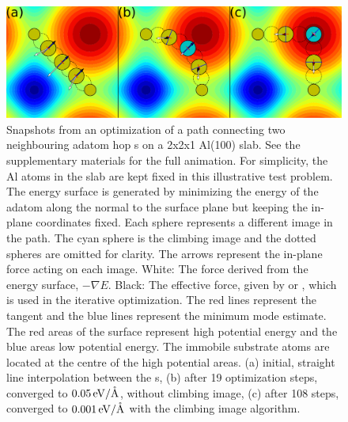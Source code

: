 \begin{figure}[b]
\begin{center}
\includegraphics[width=0.8\linewidth]{figures/snapshots}
\caption{Snapshots from an optimization of a path connecting two neighbouring adatom hop s on a 2x2x1 Al(100) slab.
See the supplementary materials for the full animation.
For simplicity, the Al atoms in the slab are kept fixed in this illustrative test problem.
The energy surface is generated by minimizing the energy of the adatom along the normal to the surface plane but keeping the in-plane coordinates fixed.
Each sphere represents a different image in the path. The cyan sphere is the climbing image and the dotted spheres are omitted for clarity.
The arrows represent the in-plane force acting on each image.
White: The force derived from the energy surface, $-\nabla E$.
Black: The effective force, given by  or , which is used in the iterative optimization.
The red lines represent the tangent and the blue lines represent the minimum mode estimate.
The red areas of the surface represent high potential energy and the blue areas low potential energy.
The immobile substrate atoms are located at the centre of the high potential areas.
(a) initial, straight line interpolation between the s, (b) after 19 optimization steps, converged to $0.05\, \mathrm{eV/\mathring{\mathrm{A}}}$, without climbing image, (c) after 108 steps, converged to $0.001\, \mathrm{eV/\mathring{\mathrm{A}}}$ with the climbing image algorithm.}
\label{fig:adatom-snapshots}
\end{center}
\end{figure}

